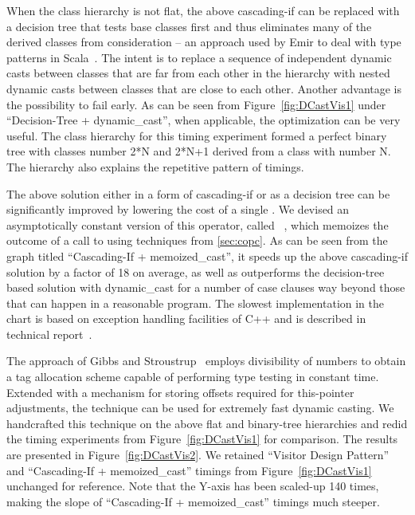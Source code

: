 When the class hierarchy is not flat, the above cascading-if can be replaced 
with a decision tree that tests base classes first and thus eliminates many of 
the derived classes from consideration -- an approach used by Emir to deal with 
type patterns in Scala~\cite[]{EmirThesis}. The intent is to 
replace a sequence of independent dynamic casts between classes that are far 
from each other in the hierarchy with nested dynamic casts between classes that 
are close to each other. Another advantage is the possibility to fail early. 
As can be seen from Figure~\ref{fig:DCastVis1} under ``Decision-Tree + 
dynamic\_cast'', when applicable, the optimization can be very useful. The class
hierarchy for this timing experiment formed a perfect binary tree with 
classes number 2*N and 2*N+1 derived from a class with number N. The hierarchy 
also explains the repetitive pattern of timings.

The above solution either in a form of cascading-if or as a decision tree can be 
significantly improved by lowering the cost of a single . 
We devised an asymptotically constant version of this operator, called
~\cite[]{TR}, which memoizes the outcome of a call to 
 using techniques from \textsection\ref{sec:copc}. As can be 
seen from the graph titled ``Cascading-If + memoized\_cast'', it speeds up the 
above cascading-if solution by a factor of 18 on average, as well as outperforms 
the decision-tree based solution with dynamic\_cast for a number of case clauses 
way beyond those that can happen in a reasonable program. The slowest 
implementation in the chart is based on exception handling facilities of C++ and 
is described in technical report~\cite[]{TR}.

The approach of Gibbs and Stroustrup~\cite{FastDynCast} employs divisibility of 
numbers to obtain a tag allocation scheme capable of performing type testing in 
constant time. Extended with a mechanism for storing offsets required for 
this-pointer adjustments, the technique can be used for extremely fast dynamic 
casting. We handcrafted this technique on the above flat 
and binary-tree hierarchies and redid the timing experiments from 
Figure~\ref{fig:DCastVis1} for comparison. The results are 
presented in Figure~\ref{fig:DCastVis2}. We retained 
``Visitor Design Pattern'' and ``Cascading-If + memoized\_cast'' timings from 
Figure~\ref{fig:DCastVis1} unchanged for reference. Note that the Y-axis has been scaled-up 
140 times, making the slope of ``Cascading-If + memoized\_cast'' timings much steeper.

